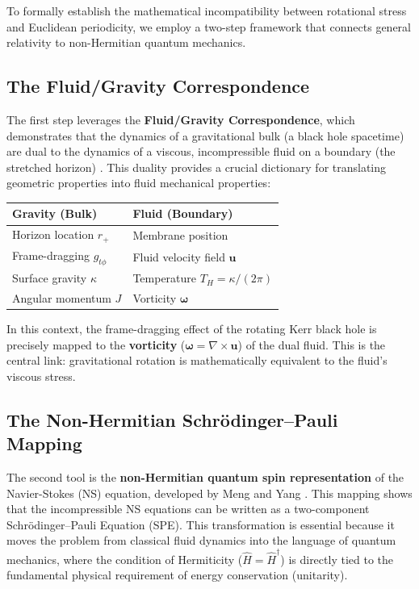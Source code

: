 \documentclass[11pt]{article}
\begin{document}
To formally establish the mathematical incompatibility between rotational stress and Euclidean periodicity, we employ a two-step framework that connects general relativity to non-Hermitian quantum mechanics.

\subsection{The Fluid/Gravity Correspondence\cite{FluidGravity2008}}

The first step leverages the \textbf{Fluid/Gravity Correspondence\cite{FluidGravity2008}}, which demonstrates that the dynamics of a gravitational bulk (a black hole spacetime) are dual to the dynamics of a viscous, incompressible fluid on a boundary (the stretched horizon) \cite{FluidGravity2008}. This duality provides a crucial dictionary for translating geometric properties into fluid mechanical properties:

\begin{center}
\begin{tabular}{|l|l|}
\hline
\textbf{Gravity (Bulk)} & \textbf{Fluid (Boundary)} \\
\hline
Horizon location $r_+$ & Membrane position \\
Frame-dragging $g_{t\phi}$ & Fluid velocity field $\mathbf{u}$ \\
Surface gravity $\kappa$ & Temperature $T_H = \kappa/(2\pi)$ \\
Angular momentum $J$ & Vorticity $\mathbf{\omega}$ \\
\hline
\end{tabular}
\end{center}

In this context, the frame-dragging effect of the rotating Kerr black hole \cite{Kerr1963} is precisely mapped to the \textbf{vorticity} ($\mathbf{\omega} = \nabla \times \mathbf{u}$) of the dual fluid. This is the central link: gravitational rotation is mathematically equivalent to the fluid's viscous stress.

\subsection{The Non-Hermitian Schr\"odinger--Pauli Mapping}

The second tool is the \textbf{non-Hermitian quantum spin representation} of the Navier-Stokes (NS) equation, developed by Meng and Yang \cite{MengYang2024}. This mapping shows that the incompressible NS equations can be written as a two-component Schr\"odinger--Pauli Equation (SPE). This transformation is essential because it moves the problem from classical fluid dynamics into the language of quantum mechanics, where the condition of Hermiticity ($\hat{H} = \hat{H}^\dagger$) is directly tied to the fundamental physical requirement of energy conservation (unitarity).
\end{document}
